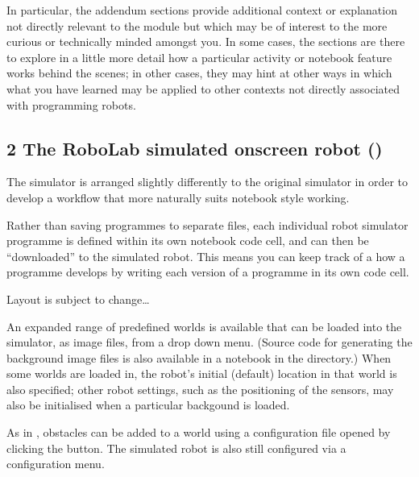 \documentclass[letterpaper,10pt,english]{sphinxmanual}
\let\sphinxpxdimen\pdfpxdimen\else\newdimen\sphinxpxdimen
\begin{document}
In particular, the addendum sections provide additional context or explanation not directly relevant to the module but which may be of interest to the more curious or technically minded amongst you. In some cases, the sections are there to explore in a little more detail how a particular activity or notebook feature works behind the scenes; in other cases, they may hint at other ways in which what you have learned may be applied to other contexts not directly associated with programming robots.


\subsection{2 The RoboLab simulated on\sphinxhyphen{}screen robot ()}
\label{\detokenize{content/00_SOFTWARE_GUIDE/Section_00_02-nb3devsim:2-The-RoboLab-simulated-on-screen-robot-(nbev3devsim)}}\label{\detokenize{content/00_SOFTWARE_GUIDE/Section_00_02-nb3devsim::doc}}
The  simulator is arranged slightly differently to the original  simulator in order to develop a workflow that more naturally suits notebook style working.

Rather than saving programmes to separate files, each individual robot simulator programme is defined within its own notebook code cell, and can then be “downloaded” to the simulated robot. This means you can keep track of a how a programme develops by writing each version of a programme in its own code cell.



Layout is subject to change…



\noindent\sphinxincludegraphics[width=2518\sphinxpxdimen,height=1592\sphinxpxdimen]{{nbev3devsim_overview}.png}

An expanded range of predefined worlds is available that can be loaded into the simulator, as image files, from a drop down menu. (Source code for generating the background image files is also available in a notebook in the  directory.) When some worlds are loaded in, the robot’s initial (default) location in that world is also specified; other robot settings, such as the positioning of the sensors, may also be initialised when a particular backgound is loaded.

As in , obstacles can be added to a world using a configuration file opened by clicking the  button. The simulated robot is also still configured via a configuration menu.
\end{document}
